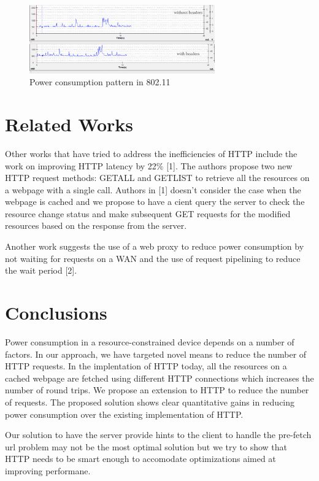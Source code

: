 \documentclass{sigplanconf}
\begin{document}
\begin{figure}[ht!]	
\centering
\includegraphics[width=80mm]{Wifi_combined.png}
\caption{Power consumption pattern in 802.11}
\label{fig:sp_gd_mnist}
\end{figure}



\section{ Related Works}

Other works that have tried to address the inefficiencies of HTTP include the work on improving HTTP latency by 22\% [1]. The authors propose two new HTTP request methods: GETALL and GETLIST to retrieve all the resources on a webpage with a single call. Authors in [1] doesn't consider the case when the webpage is cached and  we propose to have a cient query the server to check the resource change status and make subsequent GET requests for the modified resources based on the response from the server.

Another work suggests the use of a web proxy to reduce power consumption by not waiting for requests on a WAN and the use of request pipelining to reduce the wait period [2].

\section{Conclusions}

Power consumption in a resource-constrained device depends on a number of factors. In our approach, we have targeted novel means to reduce the number of HTTP requests. In the implentation of HTTP today, all the resources on a cached webpage are fetched using different HTTP connections which increases the number of round trips. We propose an extension to HTTP to reduce the number of requests. The proposed solution shows clear quantitative gains in reducing power consumption over the existing implementation of HTTP. 

Our solution to have the server provide hints to the client to handle the pre-fetch url problem may not be the most optimal solution but we try to show that HTTP needs to be smart enough 	to accomodate optimizations aimed at improving performane.
\end{document}
